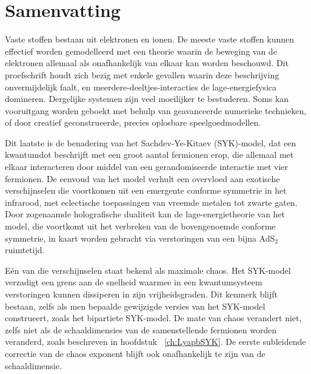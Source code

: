 \newpage
\thispagestyle{empty}

\chapter*{Samenvatting}
\label{Samenvatting}


Vaste stoffen bestaan uit elektronen en ionen. De meeste vaste stoffen kunnen effectief worden gemodelleerd met een theorie waarin de beweging van de elektronen allemaal als onafhankelijk van elkaar kan worden beschouwd. Dit proefschrift houdt zich bezig met enkele gevallen waarin deze beschrijving onvermijdelijk faalt, en meerdere-deeltjes-interacties de lage-energiefysica domineren. Dergelijke systemen zijn veel moeilijker te bestuderen. Soms kan vooruitgang worden geboekt met behulp van geavanceerde numerieke technieken, of door creatief geconstrueerde, precies oplosbare speelgoedmodellen.
\par
Dit laatste is de benadering van het Sachdev-Ye-Kitaev (SYK)-model, dat een kwantumdot beschrijft met een groot aantal fermionen erop, die allemaal met elkaar interacteren door middel van een gerandomiseerde interactie met vier fermionen. De eenvoud van het model verhult een overvloed aan exotische verschijnselen die voortkomen uit een emergente conforme symmetrie in het infrarood, met eclectische toepassingen van vreemde metalen tot zwarte gaten. Door zogenaamde holografische dualiteit kan de lage-energietheorie van het model, die voortkomt uit het verbreken van de bovengenoemde conforme symmetrie, in kaart worden gebracht via verstoringen van een bijna AdS${}_2$ ruimtetijd. 
\par
Eén van die verschijnselen staat bekend als maximale chaos. Het SYK-model verzadigt een grens aan de snelheid waarmee in een kwantumsysteem verstoringen kunnen dissiperen in zijn vrijheidsgraden. Dit kenmerk blijft bestaan, zelfs als men bepaalde gewijzigde versies van het SYK-model construeert, zoals het bipartiete SYK-model. De mate van chaos verandert niet, zelfs niet als de schaaldimensies van de samenstellende fermionen worden veranderd, zoals beschreven in hoofdstuk ~\ref {ch:LyapbSYK}. De eerste subleidende correctie van de chaos exponent blijft ook onafhankelijk te zijn van de schaaldimensie.
\par
